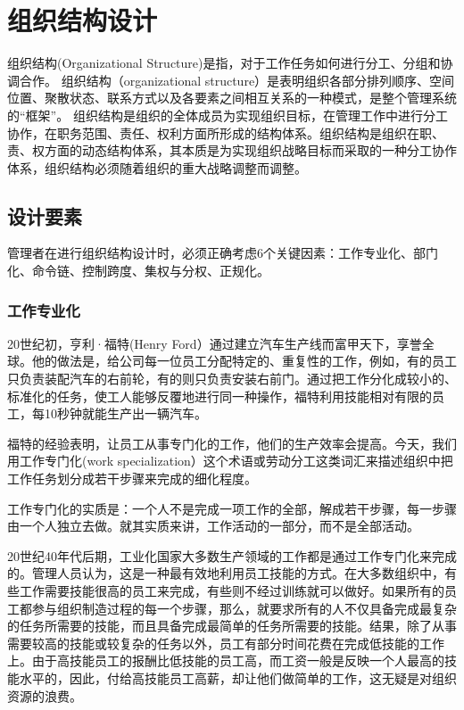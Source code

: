 
\section {组织结构设计}

    组织结构(Organizational Structure)是指，对于工作任务如何进行分工、分组和协调合作。 组织结构（organizational structure）是表明组织各部分排列顺序、空间位置、聚散状态、联系方式以及各要素之间相互关系的一种模式，是整个管理系统的“框架”。 组织结构是组织的全体成员为实现组织目标，在管理工作中进行分工协作，在职务范围、责任、权利方面所形成的结构体系。组织结构是组织在职、责、权方面的动态结构体系，其本质是为实现组织战略目标而采取的一种分工协作体系，组织结构必须随着组织的重大战略调整而调整。

\subsection{设计要素}

    管理者在进行组织结构设计时，必须正确考虑6个关键因素：工作专业化、部门化、命令链、控制跨度、集权与分权、正规化。

    \subsubsection {工作专业化}

    20世纪初，亨利·福特(Henry Ford）通过建立汽车生产线而富甲天下，享誉全球。他的做法是，给公司每一位员工分配特定的、重复性的工作，例如，有的员工只负责装配汽车的右前轮，有的则只负责安装右前门。通过把工作分化成较小的、标准化的任务，使工人能够反覆地进行同一种操作，福特利用技能相对有限的员工，每10秒钟就能生产出一辆汽车。

    福特的经验表明，让员工从事专门化的工作，他们的生产效率会提高。今天，我们用工作专门化(work specialization）这个术语或劳动分工这类词汇来描述组织中把工作任务划分成若干步骤来完成的细化程度。

    工作专门化的实质是：一个人不是完成一项工作的全部，解成若干步骤，每一步骤由一个人独立去做。就其实质来讲，工作活动的一部分，而不是全部活动。

    20世纪40年代后期，工业化国家大多数生产领域的工作都是通过工作专门化来完成的。管理人员认为，这是一种最有效地利用员工技能的方式。在大多数组织中，有些工作需要技能很高的员工来完成，有些则不经过训练就可以做好。如果所有的员工都参与组织制造过程的每一个步骤，那么，就要求所有的人不仅具备完成最复杂的任务所需要的技能，而且具备完成最简单的任务所需要的技能。结果，除了从事需要较高的技能或较复杂的任务以外，员工有部分时间花费在完成低技能的工作上。由于高技能员工的报酬比低技能的员工高，而工资一般是反映一个人最高的技能水平的，因此，付给高技能员工高薪，却让他们做简单的工作，这无疑是对组织资源的浪费。

